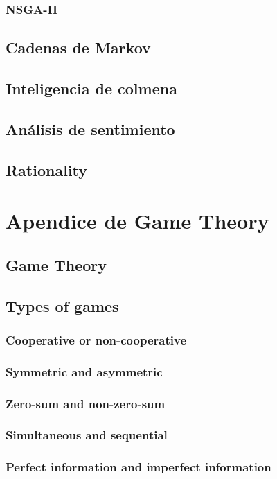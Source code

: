         \subsection{NSGA-II}
    \section{Cadenas de Markov}
    \section{Inteligencia de colmena}
    \section{Análisis de sentimiento}
    \section{Rationality}
    
\chapter{Apendice de Game Theory}
    \section{Game Theory} 
    \section{Types of games}
        \subsection{Cooperative or non-cooperative}
        \subsection{Symmetric and asymmetric}
        \subsection{Zero-sum and non-zero-sum}
        \subsection{Simultaneous and sequential}   
        \subsection{Perfect information and imperfect information}
